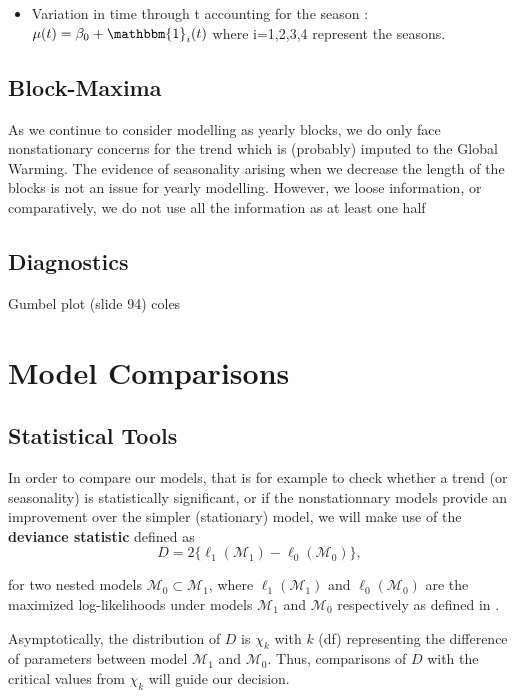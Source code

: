 \documentclass[11pt,a4paper,openany ]{book}
\begin{document}
\begin{itemize}
	\item Variation in time through t accounting for the season : $\mu (t)=\beta_0+\mathbbm{1}_i(t)$ where i=1,2,3,4 represent the seasons.
\end{itemize}



\subsection{Block-Maxima}

As we continue to consider modelling as yearly blocks, we do only face nonstationary concerns for the trend which is (probably) imputed to the Global Warming. 
The evidence of seasonality arising when we decrease the length of the blocks is not an issue for yearly modelling. However, we loose information, or comparatively, we do not use all the information as at least one half 


\subsection{Diagnostics}
Gumbel plot (slide 94) coles


\section{Model Comparisons}

\subsection{Statistical Tools}

In order to compare our models, that is for example to check whether a trend (or seasonality) is statistically significant, or if the nonstationnary models provide an improvement over the simpler (stationary) model, we will make use of the \textbf{deviance statistic} defined as 
\begin{equation}
D = 2\big\{\ell_1(\mathcal{M}_1)-\ell_0(\mathcal{M}_0)\big\},
\end{equation}

for two nested models $\mathcal{M}_0\subset \mathcal{M}_1$, where $\ell_1(\mathcal{M}_1)$ and $\ell_0(\mathcal{M}_0)$ are the maximized log-likelihoods under models $\mathcal{M}_1$ and $\mathcal{M}_0$ respectively as defined in .

Asymptotically, the distribution of $D$ is $\chi_k$ with $k$ (df) representing the difference of parameters between model $\mathcal{M}_1$ and $\mathcal{M}_0$. Thus, comparisons of $D$ with the critical values from $\chi_k$ will guide our decision.
\end{document}
